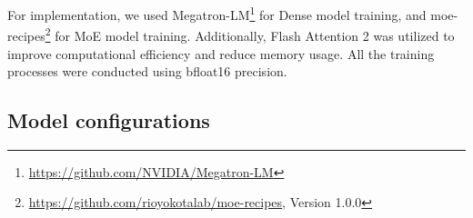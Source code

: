 For implementation, we used Megatron-LM\footnote{\url{https://github.com/NVIDIA/Megatron-LM}} for Dense model training, and moe-recipes\footnote{\url{https://github.com/rioyokotalab/moe-recipes}, Version 1.0.0} for MoE model training. 
Additionally, Flash Attention 2 \citep{dao2023flashattention2} was utilized to improve computational efficiency and reduce memory usage.
%
All the training processes were conducted using bfloat16 precision. 



\subsection{Model configurations}\label{appendix:model_configs_details}


